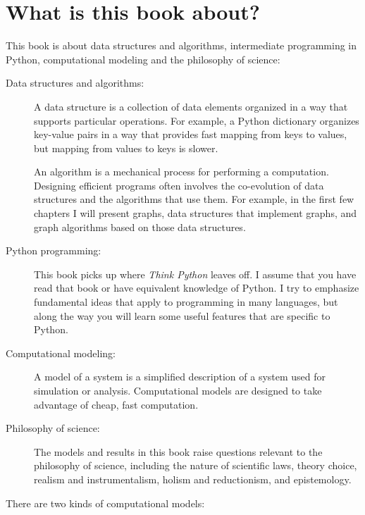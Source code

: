 \documentclass[10pt]{book}
\begin{document}
\section{What is this book about?}

This book is about data structures and algorithms, intermediate
programming in Python, computational modeling and
the philosophy of science:

\begin{description}

\item[Data structures and algorithms:] A data structure is a
  collection of data elements organized in a way that supports
  particular operations.  For example, a Python dictionary organizes
  key-value pairs in a way that provides fast mapping from keys to
  values, but mapping from values to keys is slower.

An algorithm is a mechanical process for performing a computation.
Designing efficient programs often involves the co-evolution of data
structures and the algorithms that use them.  For example, in the
first few chapters I will present graphs, data structures that
implement graphs, and graph algorithms based on those data structures.

\item[Python programming:] This book picks up where {\em Think Python}
  leaves off.  I assume that you have read that book or have
  equivalent knowledge of Python.  I try to emphasize fundamental ideas
  that apply to programming in many languages, but along the way you
  will learn some useful features that are specific to Python.

\item[Computational modeling:] A model of a system is a simplified
  description of a system used for simulation or analysis.
  Computational models are designed to take advantage of cheap, fast
  computation.

\item[Philosophy of science:] The models and results in this book
  raise questions relevant to the philosophy of science,
  including the nature of scientific laws, theory choice, realism and
  instrumentalism, holism and reductionism, and epistemology.

\end{description}

There are two kinds of computational models:
\end{document}
